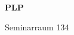 \documentclass[a4paper]{article}
\begin{document}
\printGenericVSLHeader
\begin{center}
\begin{vsltext}{3cm}{4cm}

   \vspace{0.5cm} 

    \textbf{PLP} 

    \vspace{1.5cm}

    Seminarraum 134

\end{vsltext}

\end{center}
\end{document}
